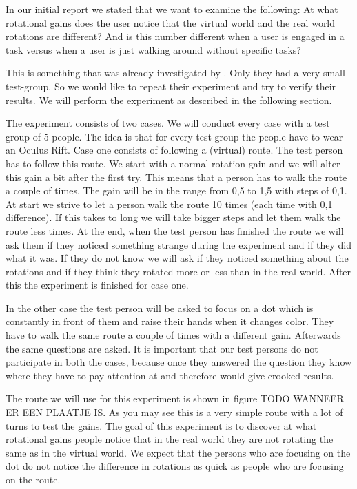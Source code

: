 In our initial report we stated that we want to examine the following:
At what rotational gains does the user notice that the virtual world and the real world rotations are different?
And is this number different when a user is engaged in a task versus when a user is just walking around without specific tasks?

This is something that was already investigated by \cite{steinicke2}. 
Only they had a very small test-group. 
So we would like to repeat their experiment and try to verify their results. 
We will perform the experiment as described in the following section.

The experiment consists of two cases. 
We will conduct every case with a test group of 5 people. 
The idea is that for every test-group the people have to wear an Oculus Rift. 
Case one consists of following a (virtual) route. 
The test person has to follow this route. 
We start with a normal rotation gain and we will alter this gain a bit after the first try. 
This means that a person has to walk the route a couple of times. 
The gain will be in the range from 0,5 to 1,5 with steps of 0,1. 
At start we strive to let a person walk the route 10 times (each time with 0,1 difference). 
If this takes to long we will take bigger steps and let them walk the route less times. 
At the end, when the test person has finished the route we will ask them if they noticed something strange during the experiment and if they did what it was. 
If they do not know we will ask if they noticed something about the rotations and if they think they rotated more or less than in the real world. 
After this the experiment is finished for case one.

In the other case the test person will be asked to focus on a dot which is constantly in front of them and raise their hands when it changes color. 
They have to walk the same route a couple of times with a different gain. 
Afterwards the same questions are asked. 
It is important that our test persons do not participate in both the cases, because once they answered the question they know where they have to pay attention at and therefore would give crooked results.

The route we will use for this experiment is shown in figure TODO WANNEER ER EEN PLAATJE IS. 
As you may see this is a very simple route with a lot of turns to test the gains. 
The goal of this experiment is to discover at what rotational gains people notice that in the real world they are not rotating the same as in the virtual world. 
We expect that the persons who are focusing on the dot do not notice the difference in rotations as quick as people who are focusing on the route. 

